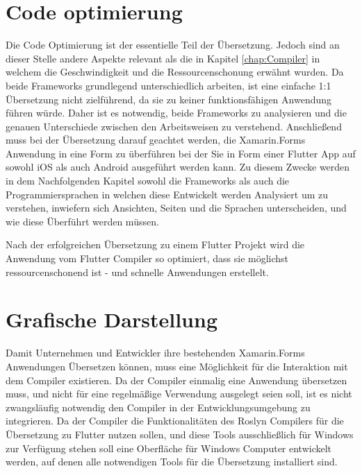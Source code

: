 \section{Code optimierung}
Die Code Optimierung ist der essentielle Teil der Übersetzung.  Jedoch sind an dieser Stelle andere Aspekte relevant als die in Kapitel \ref{chap:Compiler} in welchem die Geschwindigkeit und die Ressourcenschonung erwähnt wurden.  Da beide Frameworks grundlegend unterschiedlich arbeiten,  ist eine einfache 1:1 Übersetzung nicht zielführend,  da sie zu keiner funktionsfähigen Anwendung führen würde.  Daher ist es notwendig,  beide Frameworks zu analysieren und die genauen Unterschiede zwischen den Arbeitsweisen zu verstehend.  Anschließend muss bei der Übersetzung darauf geachtet werden,  die Xamarin.Forms Anwendung in eine Form zu überführen bei der Sie in Form einer Flutter App auf sowohl iOS als auch Android ausgeführt werden kann.  Zu diesem Zwecke werden in dem Nachfolgenden Kapitel sowohl die Frameworks als auch die Programmiersprachen in welchen diese Entwickelt werden Analysiert um zu verstehen,  inwiefern sich Ansichten, Seiten und die Sprachen unterscheiden, und wie diese Überführt werden müssen. 

Nach der erfolgreichen Übersetzung zu einem Flutter Projekt wird die Anwendung vom Flutter Compiler so optimiert, dass sie möglichst ressourcenschonend ist - und schnelle Anwendungen erstellelt. 

\section{Grafische Darstellung}
Damit Unternehmen und Entwickler ihre bestehenden Xamarin.Forms Anwendungen Übersetzen können, muss eine Möglichkeit für die Interaktion mit dem Compiler existieren.  Da der Compiler einmalig eine Anwendung übersetzen muss,  und nicht für eine regelmäßige Verwendung ausgelegt seien soll,  ist es nicht zwangsläufig notwendig den Compiler in der Entwicklungsumgebung zu integrieren.  Da der Compiler die Funktionalitäten des Roslyn Compilers für die Übersetzung zu Flutter nutzen sollen,  und diese Tools ausschließlich für Windows zur Verfügung stehen soll eine Oberfläche für Windows Computer entwickelt werden, auf denen alle notwendigen Tools für die Übersetzung installiert sind. 